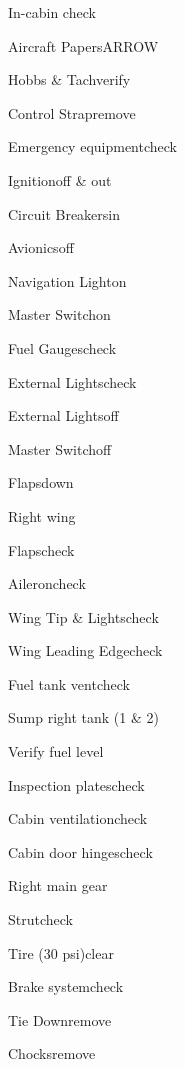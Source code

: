 





\begin{multicols}{2}
\begin{checklist}{In-cabin check}
  \item{Aircraft Papers}{ARROW}
  \item{Hobbs \& Tach}{verify}
  \item{Control Strap}{remove}
  \item{Emergency equipment}{check}
  \item{Ignition}{off \& out}
  \item{Circuit Breakers}{in}
  \item{Avionics}{off}
  \item{Navigation Light}{on}
  \item{Master Switch}{on}
  \item{Fuel Gauges}{check}
  \item{External Lights}{check}
  \item{External Lights}{off}
  \item{Master Switch}{off}
  \item{Flaps}{down}
\end{checklist}

\begin{checklist}{Right wing}
  \item{Flaps}{check}
  \item{Aileron}{check}
  \item{Wing Tip \& Lights}{check}
  \item{Wing Leading Edge}{check}
  \item{Fuel tank vent}{check}
  \item{Sump right tank (1 \& 2)}{}
  \item{Verify fuel level}{}
  \item{Inspection plates}{check}
  \item{Cabin ventilation}{check}
  \item{Cabin door hinges}{check}
\end{checklist}

\begin{checklist}{Right main gear}
  \item{Strut}{check}
  \item{Tire (30 psi)}{clear}
  \item{Brake system}{check}
  \item{Tie Down}{remove}
  \item{Chocks}{remove}
\end{checklist}


\end{multicols}
